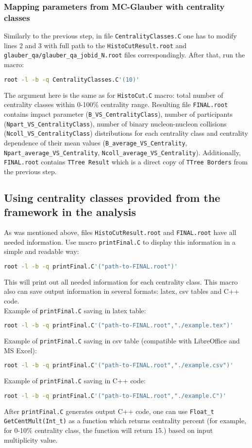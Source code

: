 \documentclass[11pt]{article}
\begin{document}
\subsubsection{Mapping parameters from MC-Glauber with centrality classes}
Similarly to the previous step, in file \texttt{CentralityClasses.C} one has to modify lines 2 and 3 with full path to the \texttt{HistoCutResult.root} and \texttt{glauber\_qa/glauber\_qa\_jobid\_N.root} files correspondingly.
After that, run the macro:
\begin{lstlisting}[language=bash,caption={}]
root -l -b -q CentralityClasses.C'(10)'
\end{lstlisting}
%
The argument here is the same as for \texttt{HistoCut.C} macro: total number of centrality classes within 0-100\% centrality range.
Resulting file \texttt{FINAL.root} contains impact parameter (\texttt{B\_VS\_CentralityClass}), number of participants (\texttt{Npart\_VS\_CentralityClass}), number of binary nucleon-nucleon collisions (\texttt{Ncoll\_VS\_CentralityClass}) distributions for each centrality class and centrality dependence of their mean values (\texttt{B\_average\_VS\_Centrality}, \texttt{Npart\_average\_VS\_Centrality}, \texttt{Ncoll\_average\_VS\_Centrality}).
Additionally, \texttt{FINAL.root} contains \texttt{TTree Result} which is a direct copy of \texttt{TTree Borders} from the previous step.

\subsection{Using centrality classes provided from the framework in the analysis}
As was mentioned above, files \texttt{HistoCutResult.root} and \texttt{FINAL.root} have all needed information.
Use macro \texttt{printFinal.C} to display this information in a simple and readable way:
\begin{lstlisting}[language=bash,caption={}]
root -l -b -q printFinal.C'("path-to-FINAL.root")'
\end{lstlisting}
%
This will print out all needed information for each centrality class.
This macro also can save output information in several formats: latex, csv tables and C++ code.\\
Example of \texttt{printFinal.C} saving in latex table:
\begin{lstlisting}[language=bash,caption={}]
root -l -b -q printFinal.C'("path-to-FINAL.root","./example.tex")'
\end{lstlisting}
%
Example of \texttt{printFinal.C} saving in csv table (compatible with LibreOffice and MS Excel):
\begin{lstlisting}[language=bash,caption={}]
root -l -b -q printFinal.C'("path-to-FINAL.root","./example.csv")'
\end{lstlisting}
%
Example of \texttt{printFinal.C} saving in C++ code:
\begin{lstlisting}[language=bash,caption={}]
root -l -b -q printFinal.C'("path-to-FINAL.root","./example.C")'
\end{lstlisting}
%
After \texttt{printFinal.C} generates output C++ code, one can use \texttt{Float\_t GetCentMult(Int\_t)} as a function which returns centrality percent (for example, for 0-10\% centrality class, the function will return 15.) based on input multiplicity value.
\end{document}
